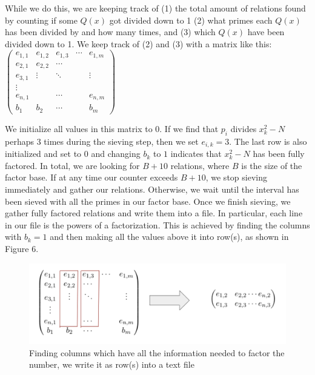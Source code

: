 \documentclass[11pt,twocolumn]{article}
\begin{document}
While we do this, we are keeping track of (1) the total amount of relations found by counting if some $Q(x)$ got divided down to 1 (2) what primes each $Q(x)$ has been divided by and how many times, and (3) which $Q(x)$ have been divided down to 1. We keep track of (2) and (3) with a matrix like this: \\

$\begin{pmatrix}
e_{1, 1} & e_{1, 2} & e_{1, 3} & \cdots & e_{1, m} \\
e_{2, 1} & e_{2, 2} & \cdots & & \\
e_{3, 1} & \vdots & \ddots & & \vdots\\
\vdots & & & & \\
e_{n, 1} & & \cdots & & e_{n, m} \\
b_1 & b_2 & \cdots & & b_m
\end{pmatrix}$


We initialize all values in this matrix to $0$. If we find that $p_i$ divides $x_k^2 - N$ perhaps $3$ times during the sieving step, then we set $e_{i, k} = 3$. The last row is also initialized and set to $0$ and changing $b_k$ to $1$ indicates that $x_k^2 - N$ has been fully factored. In total, we are looking for $B + 10$ relations, where $B$ is the size of the factor base. If at any time our counter exceeds $B+10$, we stop sieving immediately and gather our relations. Otherwise, we wait until the interval has been sieved with all the primes in our factor base. Once we finish sieving, we gather fully factored relations and write them into a file. In particular, each line in our file is the powers of a factorization. This is achieved by finding the columns with $b_k = 1$ and then making all the values above it into row(s), as shown in Figure 6.  \\

\begin{figure}[!htb]
    \centering
   \includegraphics[scale = 0.2]{fileread.png}
    \caption{Finding columns which have all the information needed to factor the number, we write it as row(s) into a text file}
    \label{Tonnelli}
\end{figure}
\end{document}

